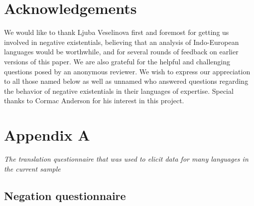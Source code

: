 ﻿\documentclass[output=paper]{langsci/langscibook}
\begin{document}
\nocite{Schmitt1991}
\nocite{Shaked1979}
\nocite{Vahman1988}
\nocite{Williams1990}
{\sloppy
\printbibliography[heading=subbibliography,keyword=source,title={Sources}]
}

\section*{Acknowledgements}

We would like to thank Ljuba Veselinova first and foremost for getting us involved in negative existentials, believing that an analysis of Indo-European languages would be worthwhile, and for several rounds of feedback on earlier versions of this paper. We are also grateful for the helpful and challenging questions posed by an anonymous reviewer. We wish to express our appreciation to all those named below as well as unnamed who answered questions regarding the behavior of negative existentials in their languages of expertise. Special thanks to Cormac Anderson for his interest in this project.

\section*{Appendix A}

\textit{The translation questionnaire that was used to elicit data for many
languages in the current sample}

\subsection*{Negation questionnaire}
\end{document}
